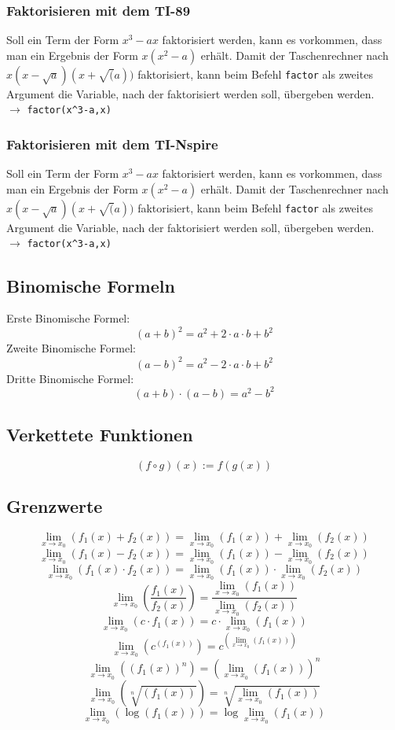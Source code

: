\subsubsection{Faktorisieren mit dem TI-89}
Soll ein Term der Form $x^3 - ax$ faktorisiert werden, kann es vorkommen, dass 
man ein Ergebnis der Form $x(x^2 - a)$ erhält. Damit der Taschenrechner nach 
$x(x-\sqrt{a})(x+\sqrt(a))$ faktorisiert, kann beim Befehl \verb!factor! als 
zweites Argument die Variable, nach der faktorisiert werden soll, übergeben 
werden. \\
$\rightarrow$ \verb!factor(x^3-a,x)!
\fi

\ifnspire
\subsubsection{Faktorisieren mit dem TI-Nspire}
Soll ein Term der Form $x^3 - ax$ faktorisiert werden, kann es vorkommen, dass 
man ein Ergebnis der Form $x(x^2 - a)$ erhält. Damit der Taschenrechner nach 
$x(x-\sqrt{a})(x+\sqrt(a))$ faktorisiert, kann beim Befehl \verb!factor! als 
zweites Argument die Variable, nach der faktorisiert werden soll, übergeben 
werden. \\
$\rightarrow$ \verb!factor(x^3-a,x)!
\fi

\subsection{Binomische Formeln}
Erste Binomische Formel: 
\[ \boxed{(a + b)^2 = a^2 + 2 \cdot a \cdot b + b^2} \]Zweite Binomische Formel: 
\[ \boxed{(a - b)^2 = a^2 - 2 \cdot a \cdot b + b^2} \]Dritte Binomische Formel: 
\[ \boxed{(a + b) \cdot (a - b) = a^2 - b^2} \]

\subsection{Verkettete Funktionen}
\[ \boxed{(f \circ g)(x) := f(g(x))} \]

\subsection{Grenzwerte}
\[ \boxed{\lim\limits_{x \to x_0}(f_1(x) + f_2(x)) 
= \lim\limits_{x \to x_0}(f_1(x)) + \lim\limits_{x \to x_0}(f_2(x))} \]
\[ \boxed{\lim\limits_{x \to x_0}(f_1(x) - f_2(x)) 
= \lim\limits_{x \to x_0}(f_1(x)) - \lim\limits_{x \to x_0}(f_2(x))} \]
\[ \boxed{\lim\limits_{x \to x_0}(f_1(x) \cdot f_2(x)) 
= \lim\limits_{x \to x_0}(f_1(x)) \cdot \lim\limits_{x \to x_0}(f_2(x))} \]
\[ \boxed{\lim\limits_{x \to x_0}\left(\frac{f_1(x)}{f_2(x)}\right) 
= \frac{\lim\limits_{x \to x_0}(f_1(x))}{\lim\limits_{x \to x_0}(f_2(x))}} \]
\[ \boxed{\lim\limits_{x \to x_0}(c \cdot f_1(x)) 
= c \cdot \lim\limits_{x \to x_0}(f_1(x))} \]
\[ \boxed{\lim\limits_{x \to x_0}\left(c^{(f_1(x))}\right) 
= c^{\left(\lim\limits_{x \to x_0}(f_1(x))\right)}} \]
\[ \boxed{\lim\limits_{x \to x_0}\left((f_1(x))^n\right) 
= \left(\lim\limits_{x \to x_0}(f_1(x))\right)^n} \]
\[ \boxed{\lim\limits_{x \to x_0}\left(\sqrt[n]{(f_1(x))}\right) 
= \sqrt[n]{\lim\limits_{x \to x_0}(f_1(x))}} \]
\[ \boxed{\lim\limits_{x \to x_0}\left(\log{(f_1(x))}\right) 
= \log{\lim\limits_{x \to x_0}(f_1(x))}} \]


